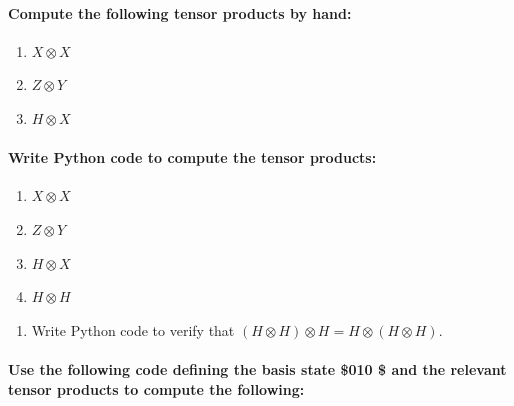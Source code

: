 \documentclass[11pt]{article}
\providecommand{\tightlist}{%
      \setlength{\itemsep}{0pt}\setlength{\parskip}{0pt}}
\begin{document}
    \hypertarget{compute-the-following-tensor-products-by-hand}{%
\paragraph{Compute the following tensor products by
hand:}\label{compute-the-following-tensor-products-by-hand}}

\begin{enumerate}
\def\labelenumi{\arabic{enumi}.}
\setcounter{enumi}{1}
\tightlist
\item
  \(X \otimes X\)
\item
  \(Z \otimes Y\)
\item
  \(H \otimes X\)
\end{enumerate}

    \hypertarget{write-python-code-to-compute-the-tensor-products}{%
\paragraph{Write Python code to compute the tensor
products:}\label{write-python-code-to-compute-the-tensor-products}}

\begin{enumerate}
\def\labelenumi{\arabic{enumi}.}
\setcounter{enumi}{4}
\tightlist
\item
  \(X \otimes X\)
\item
  \(Z \otimes Y\)
\item
  \(H \otimes X\)
\item
  \(H \otimes H\)
\end{enumerate}

    \begin{enumerate}
\def\labelenumi{\arabic{enumi}.}
\setcounter{enumi}{8}
\tightlist
\item
  Write Python code to verify that
  \((H \otimes H) \otimes H = H \otimes (H \otimes H)\).
\end{enumerate}

    \hypertarget{use-the-following-code-defining-the-basis-state-010-and-the-relevant-tensor-products-to-compute-the-following}{%
\paragraph{\texorpdfstring{Use the following code defining the basis
state \$\textbar{}010 \rangle \$ and the relevant tensor products to
compute the
following:}{Use the following code defining the basis state \$\textbar{}010 \$ and the relevant tensor products to compute the following:}}\label{use-the-following-code-defining-the-basis-state-010-and-the-relevant-tensor-products-to-compute-the-following}}
\end{document}
